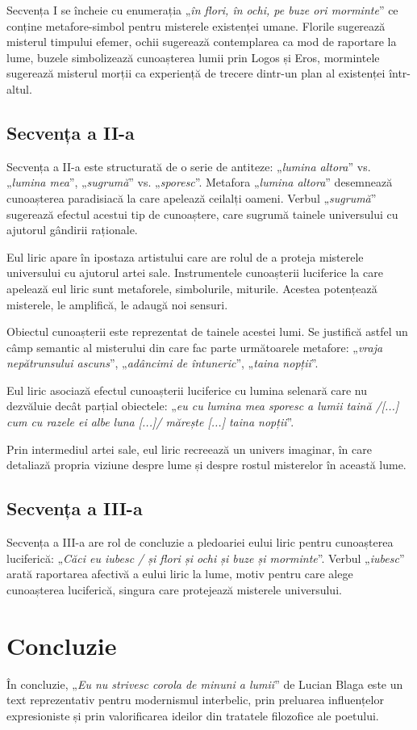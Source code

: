 \documentclass{article}
\newcommand{\qu}[1]{„\emph{#1}”}
\begin{document}
Secvența I se încheie cu enumerația \qu{în flori, în ochi, pe buze ori morminte} ce conține metafore-simbol pentru misterele existenței umane. Florile sugerează misterul timpului efemer, ochii sugerează contemplarea ca mod de raportare la lume, buzele simbolizează cunoașterea lumii prin Logos și Eros, mormintele sugerează misterul morții ca experiență de trecere dintr-un plan al existenței într-altul.

\subsection{Secvența a II-a}
Secvența a II-a este structurată de o serie de antiteze: \qu{lumina altora} vs. \qu{lumina mea}, \qu{sugrumă} vs. \qu{sporesc}. Metafora \qu{lumina altora} desemnează cunoașterea paradisiacă la care apelează ceilalți oameni. Verbul \qu{sugrumă} sugerează efectul acestui tip de cunoaștere, care sugrumă tainele universului cu ajutorul gândirii raționale.

Eul liric apare în ipostaza artistului care are rolul de a proteja misterele universului cu ajutorul artei sale. Instrumentele cunoașterii luciferice la care apelează eul liric sunt metaforele, simbolurile, miturile. Acestea potențează misterele, le amplifică, le adaugă noi sensuri.

Obiectul cunoașterii este reprezentat de tainele acestei lumi. Se justifică astfel un câmp semantic al misterului din care fac parte următoarele metafore: \qu{vraja nepătrunsului ascuns}, \qu{adâncimi de întuneric}, \qu{taina nopții}.

Eul liric asociază efectul cunoașterii luciferice cu lumina selenară care nu dezvăluie decât parțial obiectele: \qu{eu cu lumina mea sporesc a lumii taină /[...] cum cu razele ei albe luna [...]/ mărește [...] taina nopții}.

Prin intermediul artei sale, eul liric recreează un univers imaginar, în care detaliază propria viziune despre lume și despre rostul misterelor în această lume.

\subsection{Secvența a III-a}
Secvența a III-a are rol de concluzie a pledoariei eului liric pentru cunoașterea luciferică: \qu{Căci eu iubesc / și flori și ochi și buze și morminte}. Verbul \qu{iubesc} arată raportarea afectivă a eului liric la lume, motiv pentru care alege cunoașterea luciferică, singura care protejează misterele universului.

\section{Concluzie}
În concluzie, \qu{Eu nu strivesc corola de minuni a lumii} de Lucian Blaga este un text reprezentativ pentru modernismul interbelic, prin preluarea influențelor expresioniste și prin valorificarea ideilor din tratatele filozofice ale poetului.
\end{document}
